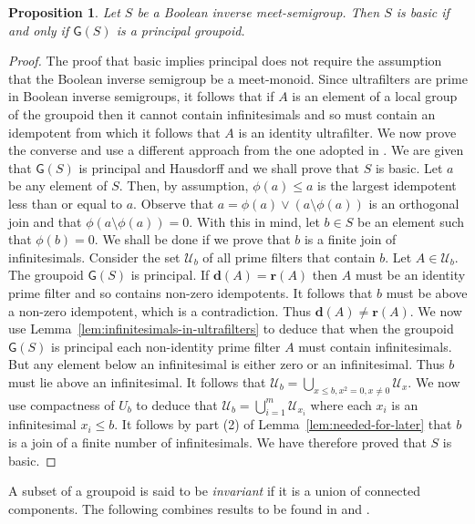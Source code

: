 \documentclass[a4paper]{amsart}
\newtheorem{proposition}[theorem]{Proposition}
\begin{document}
\begin{proposition}\label{prop:basic-principal} Let $S$ be a Boolean inverse meet-semigroup.
Then $S$ is basic if and only if $\mathsf{G}(S)$ is a principal groupoid.
\end{proposition}
\begin{proof} The proof that basic implies principal does not require the assumption that
the Boolean inverse semigroup be a meet-monoid.
Since ultrafilters are prime in Boolean inverse semigroups,
it follows that if $A$ is an element of a local group of the groupoid
then it cannot contain infinitesimals and so must contain an idempotent from which it follows that $A$ is an identity
ultrafilter.
We now prove the converse and use a different approach from the one adopted in \cite{Lawson2016}.
We are given that $\mathsf{G}(S)$ is principal and Hausdorff and we shall prove that $S$ is basic.
Let $a$ be any element of $S$.
Then, by assumption, $\phi (a) \leq a$ is the largest idempotent less than or equal to $a$.
Observe that $a = \phi (a) \vee (a \setminus \phi (a))$ is an orthogonal join
and that $\phi (a \setminus \phi (a)) = 0$.
With this in mind,
let $b \in S$ be an element such that $\phi (b) = 0$.
We shall be done if we prove that $b$ is a finite join of infinitesimals.
Consider the set $\mathscr{U}_{b}$ of all prime filters that contain $b$.
Let $A \in \mathscr{U}_{b}$.
The groupoid $\mathsf{G}(S)$ is principal.
If $\mathbf{d}(A) = \mathbf{r}(A)$ then $A$ must be an identity prime filter and so
contains non-zero idempotents.
It follows that $b$ must be above a non-zero idempotent, which is a contradiction.
Thus $\mathbf{d}(A) \neq \mathbf{r}(A)$.
We now use Lemma~\ref{lem:infinitesimals-in-ultrafilters} to deduce that
when the groupoid $\mathsf{G}(S)$ is principal each non-identity prime filter $A$ must contain infinitesimals.
But any element below an infinitesimal is either zero or an infinitesimal.
Thus $b$ must lie above an infinitesimal.
It follows that $\mathscr{U}_{b} = \bigcup_{x \leq b, x^{2} = 0, x \neq 0} \mathscr{U}_{x}$.
We now use compactness of $U_{b}$ to deduce that 
$\mathscr{U}_{b} = \bigcup_{i=1}^{m} \mathscr{U}_{x_{i}}$ 
where each $x_{i}$ is an infinitesimal $x_{i} \leq b$.
It follows by part (2) of Lemma~\ref{lem:needed-for-later} 
that $b$ is a join of a finite number of infinitesimals.
We have therefore proved that $S$ is basic.
\end{proof}

A subset of a groupoid is said to be {\em invariant} if it is a union of connected components.
The following combines results to be found in \cite{Lenz} and \cite{Lawson2016}. 
\end{document}

